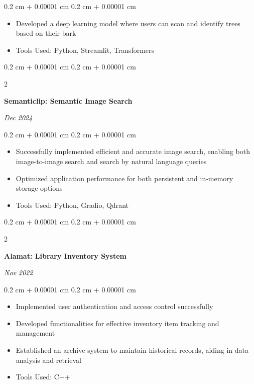 \documentclass[10pt, letterpaper]{article}
\newenvironment{highlights}{
    \begin{itemize}[
        topsep=0.10 cm,
        parsep=0.10 cm,
        partopsep=0pt,
        itemsep=0pt,
        leftmargin=0.4 cm + 10pt
    ]
}{
    \end{itemize}
} %
\newenvironment{onecolentry}{
    \begin{adjustwidth}{
        0.2 cm + 0.00001 cm
    }{
        0.2 cm + 0.00001 cm
    }
}{
    \end{adjustwidth}
} %
\newenvironment{twocolentry}[2][]{
    \onecolentry
    \def\secondColumn{#2}
    \setcolumnwidth{\fill, 4.5 cm}
    \begin{paracol}{2}
}{
    \switchcolumn \raggedleft \secondColumn
    \end{paracol}
    \endonecolentry
} %
\begin{document}
        \vspace{0.10 cm}
        \begin{onecolentry}
            \begin{highlights}
                \item Developed a deep learning model where users can scan and identify trees based on their bark
                \item Tools Used: Python, Streamlit, Transformers
            \end{highlights}
        \end{onecolentry}


        \vspace{0.2 cm}

        \begin{twocolentry}{
            
            
        \textit{Dec 2024}}
            \textbf{Semanticlip: Semantic Image Search}
        \end{twocolentry}

        \vspace{0.10 cm}
        \begin{onecolentry}
            \begin{highlights}
                \item Successfully implemented efficient and accurate image search, enabling both image-to-image search and search by natural language queries
                \item Optimized application performance for both persistent and in-memory storage options
                \item Tools Used: Python, Gradio, Qdrant
            \end{highlights}
        \end{onecolentry}


        \vspace{0.2 cm}

        \begin{twocolentry}{
            
            
        \textit{Nov 2022}}
            \textbf{Alamat: Library Inventory System}
        \end{twocolentry}

        \vspace{0.10 cm}
        \begin{onecolentry}
            \begin{highlights}
                \item Implemented user authentication and access control successfully
                \item Developed functionalities for effective inventory item tracking and management
                \item Established an archive system to maintain historical records, aiding in data analysis and retrieval
                \item Tools Used: C++
            \end{highlights}
        \end{onecolentry}



    
\end{document}
